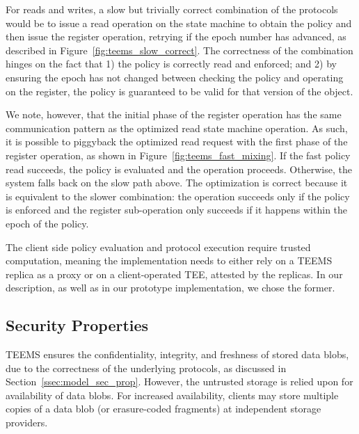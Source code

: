 For reads and writes, a slow but trivially correct combination of
the protocols would be to issue a read operation on the state
machine to obtain the policy and then issue the register
operation, retrying if the epoch number has advanced, as described in Figure~\ref{fig:teems_slow_correct}.
The correctness of the combination hinges on the fact that 1) the
policy is correctly read and enforced; and 2) by ensuring the epoch
has not changed between checking the policy and operating on the
register, the policy is guaranteed to be valid for that version of the
object.


We note, however, that the initial phase of the register operation has
the same communication pattern as the optimized read state machine
operation. As such, it is possible to piggyback the optimized read
request with the first phase of the register operation, as shown in
Figure~\ref{fig:teems_fast_mixing}. If the fast policy read succeeds,
the policy is evaluated and the operation proceeds.  Otherwise, the
system falls back on the slow path above. The optimization is correct
because it is equivalent to the slower combination: the operation
succeeds only if the policy is enforced and the register sub-operation
only succeeds if it happens within the epoch of the policy.

The client side policy evaluation and protocol execution require
trusted computation, meaning the implementation needs to either
rely on a \ac{TEEMS} replica as a proxy or on a client-operated \ac{TEE},
attested by the replicas. In our description, as well as in our
prototype implementation, we chose the former.

\subsection{Security Properties}

\ac{TEEMS} ensures the confidentiality, integrity, and
freshness of stored data blobs, due to the correctness of the
underlying protocols, as discussed in
Section~\ref{ssec:model_sec_prop}. However, the untrusted storage is relied
upon for availability of data blobs. For increased availability,
clients may store multiple copies of a data blob (or
erasure-coded fragments) at independent storage providers.
%

